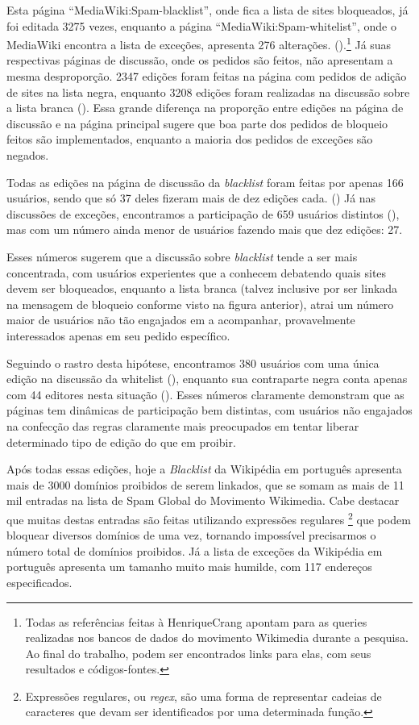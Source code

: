 Esta página ``MediaWiki:Spam-blacklist'', onde fica a lista de sites bloqueados, já foi editada 3275 vezes, enquanto a página ``MediaWiki:Spam-whitelist'', onde o MediaWiki encontra a lista de exceções,  apresenta 276 alterações. (\cite{quarry_edit_mediawiki_namespace}).\footnote{Todas as referências feitas à HenriqueCrang apontam para as queries realizadas nos bancos de dados do movimento Wikimedia durante a pesquisa. Ao final do trabalho, podem ser encontrados links para elas, com seus resultados e códigos-fontes.} Já suas respectivas páginas de discussão, onde os pedidos são feitos, não apresentam a mesma desproporção. 2347 edições foram feitas na página com pedidos de adição de sites na lista negra, enquanto 3208 edições foram realizadas na discussão sobre a lista branca (\cite{quarry_edit_mediawiki_talk_namespace}). Essa grande diferença na proporção entre edições na página de discussão e na página principal sugere que boa parte dos pedidos de bloqueio feitos são implementados, enquanto a maioria dos pedidos de exceções são negados.

Todas as edições na página de discussão da \textit{blacklist} foram feitas por apenas 166 usuários, sendo que só 37 deles fizeram mais de dez edições cada. (\cite{quarry_edit_sbl_talk_page}) Já nas discussões de exceções, encontramos a participação de 659 usuários distintos (\cite{quarry_edit_swl_talk_page}), mas com um número ainda menor de usuários fazendo mais que dez edições: 27.

Esses números sugerem que a discussão sobre \textit{blacklist} tende a ser mais concentrada, com usuários experientes que a conhecem debatendo quais sites devem ser bloqueados, enquanto a lista branca (talvez inclusive por ser linkada na mensagem de bloqueio conforme visto na figura anterior), atrai um número maior de usuários não tão engajados em a acompanhar, provavelmente interessados apenas em seu pedido específico.

Seguindo o rastro desta hipótese, encontramos 380 usuários com uma única edição na discussão da whitelist (\cite{quarry_only_1edit_swl_talk_page}), enquanto sua contraparte negra conta apenas com 44 editores nesta situação (\cite{quarry_only_1edit_sbl_talk_page}). Esses números claramente demonstram que as páginas tem dinâmicas de participação bem distintas, com usuários não engajados na confecção das regras claramente mais preocupados em tentar liberar determinado tipo de edição do que em proibir.

Após todas essas edições, hoje a \textit{Blacklist} da Wikipédia em português apresenta mais de 3000 domínios proibidos de serem linkados, que se somam as mais de 11 mil entradas na lista de Spam Global do Movimento Wikimedia.  Cabe destacar que muitas destas entradas são feitas utilizando expressões regulares \footnote{Expressões regulares, ou \textit{regex}, são uma forma de representar cadeias de caracteres que devam ser identificados por uma determinada função.} que podem bloquear diversos domínios de uma vez, tornando impossível precisarmos o número total de domínios proibidos. Já a lista de exceções da Wikipédia em português apresenta um tamanho muito mais humilde, com 117 endereços especificados.


